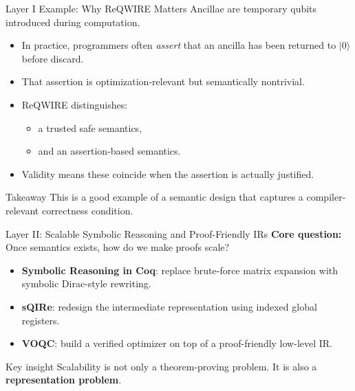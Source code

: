 \documentclass[aspectratio=169]{beamer}
\begin{document}
\begin{frame}{Layer I Example: Why ReQWIRE Matters}
\justifying
Ancillae are temporary qubits introduced during computation.

\vspace{0.5em}
\begin{itemize}
    \item In practice, programmers often \emph{assert} that an ancilla has been returned to $\lvert 0 \rangle$ before discard.
    \item That assertion is optimization-relevant but semantically nontrivial.
    \item ReQWIRE distinguishes:
    \begin{itemize}
        \item a trusted safe semantics,
        \item and an assertion-based semantics.
    \end{itemize}
    \item Validity means these coincide when the assertion is actually justified.
\end{itemize}

\pause

\begin{block}{Takeaway}
This is a good example of a semantic design that captures a compiler-relevant correctness condition.
\end{block}
\end{frame}

\begin{frame}{Layer II: Scalable Symbolic Reasoning and Proof-Friendly IRs}
\justifying
\textbf{Core question:} Once semantics exists, how do we make proofs scale?

\vspace{0.5em}
\begin{itemize}
    \item \textbf{Symbolic Reasoning in Coq}: replace brute-force matrix expansion with symbolic Dirac-style rewriting.
    \item \textbf{sQIRe}: redesign the intermediate representation using indexed global registers.
    \item \textbf{VOQC}: build a verified optimizer on top of a proof-friendly low-level IR.
\end{itemize}

\pause

\begin{block}{Key insight}
Scalability is not only a theorem-proving problem. It is also a \textbf{representation problem}.
\end{block}
\end{frame}
\end{document}
